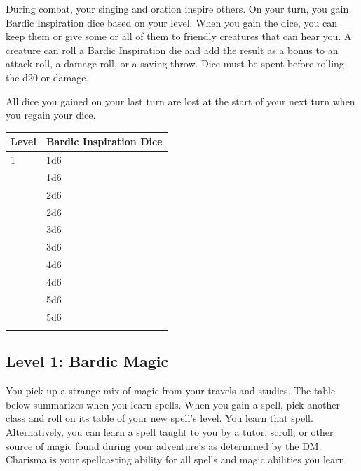 \documentclass[12pt,letterpaper,twocolumn,openany,nodeprecatedcode,bg=none]{dndbook}
\let\oldsubsection\subsection
\renewcommand{\subsection}[1]{%
  \needspace{5\baselineskip}%
  \oldsubsection{#1}%
}
\begin{document}
During combat, your singing and oration inspire others. On your turn,
you gain Bardic Inspiration dice based on your level. When you gain the
dice, you can keep them or give some or all of them to friendly
creatures that can hear you. A creature can roll a Bardic Inspiration
die and add the result as a bonus to an attack roll, a damage roll, or a
saving throw. Dice must be spent before rolling the d20 or damage.

All dice you gained on your last turn are lost at the start of your next
turn when you regain your dice.


{\def\LTcaptype{none} %
\begin{table}[!htbp]
\centering
\begin{tabular}{@{}
  >{\raggedright\arraybackslash}p{}
  >{\raggedright\arraybackslash}p{}@{}}
\toprule\noalign{}
\begin{minipage}[b]{\linewidth}\raggedright
Level
\end{minipage} & \begin{minipage}[b]{\linewidth}\raggedright
Bardic Inspiration Dice
\end{minipage} \\
\midrule\noalign{}
1 & 1d6 \\
2 & 1d6 \\
3 & 2d6 \\
4 & 2d6 \\
5 & 3d6 \\
6 & 3d6 \\
7 & 4d6 \\
8 & 4d6 \\
9 & 5d6 \\
10 & 5d6 \\
\bottomrule\noalign{}
\end{tabular}
\end{table}
}

\subsection{Level 1: Bardic Magic}\label{level-1-bardic-magic}

You pick up a strange mix of magic from your travels and studies. The
table below summarizes when you learn spells. When you gain a spell,
pick another class and roll on its table of your new spell's level. You
learn that spell. Alternatively, you can learn a spell taught to you by
a tutor, scroll, or other source of magic found during your adventure's
as determined by the DM. Charisma is your spellcasting ability for all
spells and magic abilities you learn.
\end{document}
